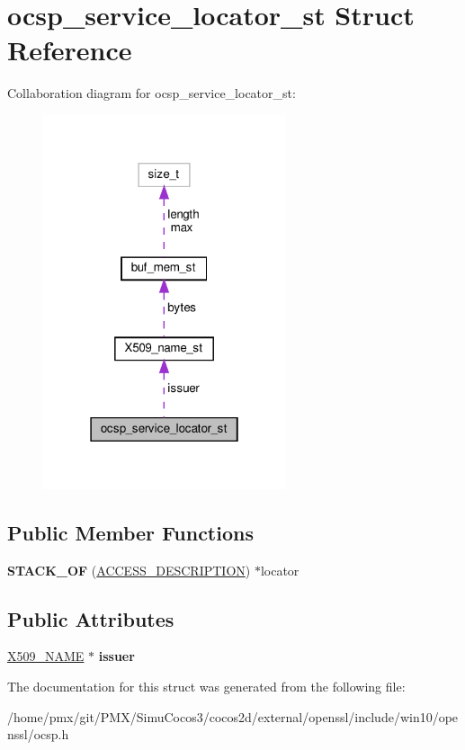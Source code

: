 \hypertarget{structocsp__service__locator__st}{}\section{ocsp\+\_\+service\+\_\+locator\+\_\+st Struct Reference}
\label{structocsp__service__locator__st}


Collaboration diagram for ocsp\+\_\+service\+\_\+locator\+\_\+st\+:
\nopagebreak
\begin{figure}[H]
\begin{center}
\leavevmode
\includegraphics[width=202pt]{structocsp__service__locator__st__coll__graph}
\end{center}
\end{figure}
\subsection*{Public Member Functions}
\begin{DoxyCompactItemize}
\item 
\mbox{\label{structocsp__service__locator__st_a77da4c654efc14b8d701175f67b4e766}} 
{\bfseries S\+T\+A\+C\+K\+\_\+\+OF} (\hyperlink{structACCESS__DESCRIPTION__st}{A\+C\+C\+E\+S\+S\+\_\+\+D\+E\+S\+C\+R\+I\+P\+T\+I\+ON}) $\ast$locator
\end{DoxyCompactItemize}
\subsection*{Public Attributes}
\begin{DoxyCompactItemize}
\item 
\mbox{\label{structocsp__service__locator__st_a223e62f217b2c10dd2502284591296ab}} 
\hyperlink{structX509__name__st}{X509\+\_\+\+N\+A\+ME} $\ast$ {\bfseries issuer}
\end{DoxyCompactItemize}


The documentation for this struct was generated from the following file\+:\begin{DoxyCompactItemize}
\item 
/home/pmx/git/\+P\+M\+X/\+Simu\+Cocos3/cocos2d/external/openssl/include/win10/openssl/ocsp.\+h\end{DoxyCompactItemize}
